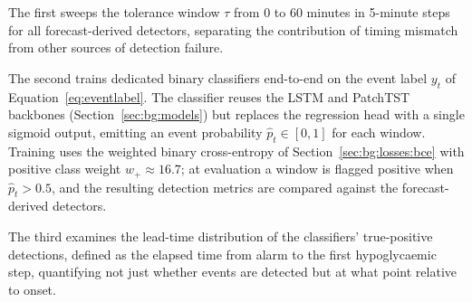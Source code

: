The first sweeps the tolerance window $\tau$ from 0 to 60 minutes in 5-minute steps for all forecast-derived detectors, separating the contribution of timing mismatch from other sources of detection failure.

The second trains dedicated binary classifiers end-to-end on the event label $y_t$ of Equation~\ref{eq:eventlabel}. The classifier reuses the LSTM and PatchTST backbones (Section~\ref{sec:bg:models}) but replaces the regression head with a single sigmoid output, emitting an event probability $\hat{p}_t \in [0,1]$ for each window. Training uses the weighted binary cross-entropy of Section~\ref{sec:bg:losses:bce} with positive class weight $w_{+} \approx 16.7$; at evaluation a window is flagged positive when $\hat{p}_t > 0.5$, and the resulting detection metrics are compared against the forecast-derived detectors.

The third examines the lead-time distribution of the classifiers' true-positive detections, defined as the elapsed time from alarm to the first hypoglycaemic step, quantifying not just whether events are detected but at what point relative to onset.
